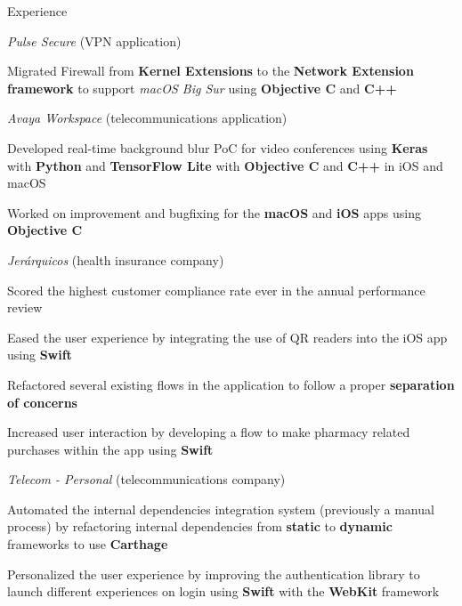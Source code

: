 \documentclass{curriculum}
\begin{document}
\begin{cvsection}{Experience}
\begin{sectionitemlist}
        \item{\textit{Pulse Secure} (VPN application)}
            \begin{sectionitemlist}
            \item{Migrated Firewall from \textbf{Kernel Extensions} to the \textbf{Network Extension framework} to support \textit{macOS Big Sur} using \textbf{Objective C} and \textbf{C++}}
            \end{sectionitemlist}

        \item{\textit{Avaya Workspace} (telecommunications application)}
            \begin{sectionitemlist}
            \item{Developed real-time background blur PoC for video conferences using \textbf{Keras} with \textbf{Python} and \textbf{TensorFlow Lite} with \textbf{Objective C} and \textbf{C++} in iOS and macOS}
            \item{Worked on improvement and bugfixing for the \textbf{macOS} and \textbf{iOS} apps using \textbf{Objective C}}
            \end{sectionitemlist}

        \item{\textit{Jerárquicos} (health insurance company)}
            \begin{sectionitemlist}
            \item{Scored the highest customer compliance rate ever in the annual performance review}
            \item{Eased the user experience by integrating the use of QR readers into the iOS app using \textbf{Swift}}
            \item{Refactored several existing flows in the application to follow a proper \textbf{separation of concerns}}
            \item {Increased user interaction by developing a flow to make pharmacy related purchases within the app using \textbf{Swift}}
            \end{sectionitemlist}

        \item{\textit{Telecom - Personal} (telecommunications company)}
            \begin{sectionitemlist}
            \item{Automated the internal dependencies integration system (previously a manual process) by refactoring internal dependencies from \textbf{static} to \textbf{dynamic} frameworks to use \textbf{Carthage}}
            \item{Personalized the user experience by improving the authentication library to launch different experiences on login using \textbf{Swift} with the \textbf{WebKit} framework}
            \end{sectionitemlist}


\end{sectionitemlist}
\end{cvsection}
\end{document}
